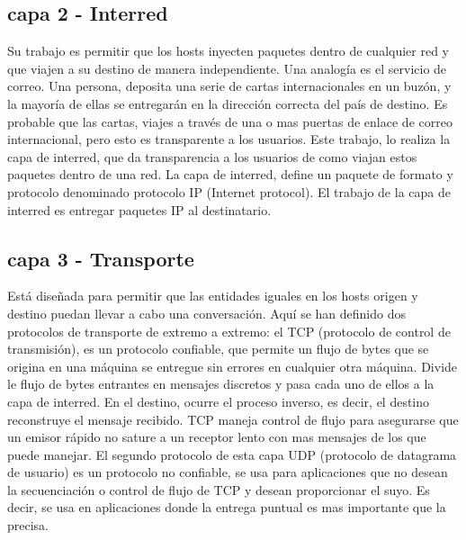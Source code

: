 \subsection{capa 2 - Interred}
Su trabajo es permitir que los hosts inyecten paquetes dentro de cualquier red y que viajen a su destino de manera independiente. Una analogía es el servicio de correo. Una persona, deposita una serie de cartas internacionales en un buzón, y la mayoría de ellas se entregarán en la dirección correcta del país de destino. Es probable que las cartas, viajes a través de una o mas puertas de enlace de correo internacional, pero esto es transparente a los usuarios. Este trabajo, lo realiza la capa de interred, que da transparencia a los usuarios de como viajan estos paquetes dentro de una red. 
La capa de interred, define un paquete de formato y protocolo denominado protocolo IP (Internet protocol). El trabajo de la capa de interred es entregar paquetes IP al destinatario. 

\subsection{capa 3 - Transporte}
Está diseñada para permitir que las entidades iguales en los hosts origen y destino puedan llevar a cabo una conversación. Aquí se han definido dos protocolos de transporte de extremo a extremo: el TCP (protocolo de control de transmisión), es un protocolo confiable, que permite un flujo de bytes que se origina en una máquina se entregue sin errores en cualquier otra máquina. Divide le flujo de bytes entrantes en mensajes discretos y pasa cada uno de ellos a la capa de interred. En el destino, ocurre el proceso inverso, es decir, el destino reconstruye el mensaje recibido. TCP maneja control de flujo para asegurarse que un emisor rápido no sature a un receptor lento con mas mensajes de los que puede manejar. 
El segundo protocolo de esta capa UDP (protocolo de datagrama de usuario) es un protocolo no confiable, se usa para aplicaciones que no desean la secuenciación o control de flujo de TCP y desean proporcionar el suyo. Es decir, se usa en aplicaciones donde la entrega puntual es mas importante que la precisa. 



